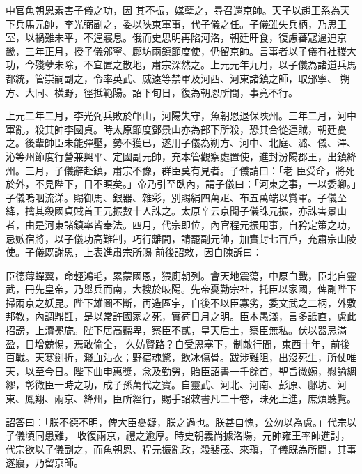 \begin{pinyinscope}
 中官魚朝恩素害子儀之功，因
 其不振，媒孽之，尋召還京師。天子以趙王系為天下兵馬元帥，李光弼副之，委以陜東軍事，代子儀之任。子儀雖失兵柄，乃思王室，以禍難未平，不遑寢息。俄而史思明再陷河洛，朝廷旰食，復慮蕃寇逼迫京畿，三年正月，授子儀邠寧、鄜坊兩鎮節度使，仍留京師。言事者以子儀有社稷大功，今殘孽未除，不宜置之散地，肅宗深然之。上元元年九月，以子儀為諸道兵馬都統，管崇嗣副之，令率英武、威遠等禁軍及河西、河東諸鎮之師，取邠寧、
 朔方、大同、橫野，徑抵範陽。詔下旬日，復為朝恩所間，事竟不行。



 上元二年二月，李光弼兵敗於邙山，河陽失守，魚朝恩退保陜州。三年二月，河中軍亂，殺其帥李國貞。時太原節度鄧景山亦為部下所殺，恐其合從連賊，朝廷憂之。後輩帥臣未能彈壓，勢不獲已，遂用子儀為朔方、河中、北庭、潞、儀、澤、沁等州節度行營兼興平、定國副元帥，充本管觀察處置使，進封汾陽郡王，出鎮絳州。三月，子儀辭赴鎮，肅宗不豫，群臣莫有見者。子儀請曰：「老
 臣受命，將死於外，不見陛下，目不瞑矣。」帝乃引至臥內，謂子儀曰：「河東之事，一以委卿。」子儀嗚咽流涕。賜御馬、銀器、雜彩，別賜絹四萬疋、布五萬端以賞軍。子儀至絳，擒其殺國貞賊首王元振數十人誅之。太原辛云京聞子儀誅元振，亦誅害景山者，由是河東諸鎮率皆奉法。四月，代宗即位，內官程元振用事，自矜定策之功，忌嫉宿將，以子儀功高難制，巧行離間，請罷副元帥，加實封七百戶，充肅宗山陵使。子儀既謝恩，上表進肅宗所賜
 前後詔敕，因自陳訴曰：



 臣德薄蟬翼，命輕鴻毛，累蒙國恩，猥廁朝列。會天地震蕩，中原血戰，臣北自靈武，冊先皇帝，乃舉兵而南，大搜於岐陽。先帝憂勤宗社，托臣以家國，俾副陛下掃兩京之妖昆。陛下雄圖丕斷，再造區宇，自後不以臣寡劣，委文武之二柄，外敷邦教，內調鼎飪，是以常許國家之死，實荷日月之明。臣本愚淺，言多詆直，慮此招謗，上瀆冕旒。陛下居高聽卑，察臣不貳，皇天后土，察臣無私。伏以器忌滿盈，日增兢惕，焉敢偷全，
 久妨賢路？自受恩塞下，制敵行間，東西十年，前後百戰。天寒劍折，濺血沾衣；野宿魂驚，飲冰傷骨。跋涉難阻，出沒死生，所仗唯天，以至今日。陛下曲申惠獎，念及勤勞，貽臣詔書一千餘首，聖旨微婉，慰諭綢繆，彰微臣一時之功，成子孫萬代之寶。自靈武、河北、河南、彭原、鄜坊、河東、鳳翔、兩京、絳州，臣所經行，賜手詔敕書凡二十卷，昧死上進，庶煩聽覽。



 詔答曰：「朕不德不明，俾大臣憂疑，朕之過也。朕甚自愧，公勿以為慮。」代宗以子儀頃同患難，
 收復兩京，禮之逾厚。時史朝義尚據洛陽，元帥雍王率師進討，代宗欲以子儀副之，而魚朝恩、程元振亂政，殺裴茂、來瑱，子儀既為所間，其事遂寢，乃留京師。




\end{pinyinscope}
